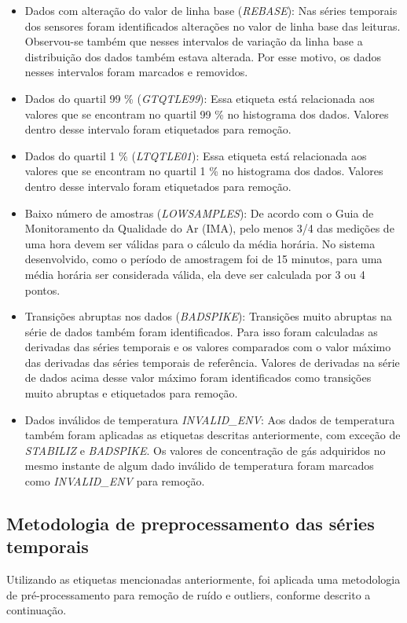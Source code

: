 \begin{itemize}
    \item Dados com alteração do valor de linha base (\textit{REBASE}): Nas séries temporais dos sensores foram identificados alterações no valor de linha base das leituras. Observou-se também que nesses intervalos de variação da linha base a distribuição dos dados também estava alterada. Por esse motivo, os dados nesses intervalos foram marcados e removidos.
    \item Dados do quartil 99 \% (\textit{GTQTLE99}): Essa etiqueta está relacionada aos valores que se encontram no quartil 99 \% no histograma dos dados. Valores dentro desse intervalo foram etiquetados para remoção.
    \item Dados do quartil 1 \% (\textit{LTQTLE01}): Essa etiqueta está relacionada aos valores que se encontram no quartil 1 \% no histograma dos dados. Valores dentro desse intervalo foram etiquetados para remoção.
    \item Baixo número de amostras (\textit{LOWSAMPLES}): De acordo com o Guia de Monitoramento da Qualidade do Ar (IMA), pelo menos 3/4 das medições de uma hora devem ser válidas para o cálculo da média horária. No sistema desenvolvido, como o período de amostragem foi de 15 minutos, para uma média horária ser considerada válida, ela deve ser calculada por 3 ou 4 pontos.
    \item Transições abruptas nos dados (\textit{BADSPIKE}): Transições muito abruptas na série de dados também foram identificados. Para isso foram calculadas as derivadas das séries temporais e os valores comparados com o valor máximo das derivadas das séries temporais de referência. Valores de derivadas na série de dados acima desse valor máximo foram identificados como transições muito abruptas e etiquetados para remoção.
    \item Dados inválidos de temperatura \textit{INVALID\_ENV}: Aos dados de temperatura também foram aplicadas as etiquetas descritas anteriormente, com exceção de \textit{STABILIZ} e \textit{BADSPIKE}. Os valores de concentração de gás adquiridos no mesmo instante de algum dado inválido de temperatura foram marcados como \textit{INVALID\_ENV} para remoção.    
\end{itemize}

\subsection{Metodologia de preprocessamento das séries temporais}

Utilizando as etiquetas mencionadas anteriormente, foi aplicada uma metodologia de pré-processamento para remoção de ruído e outliers, conforme descrito a continuação.

